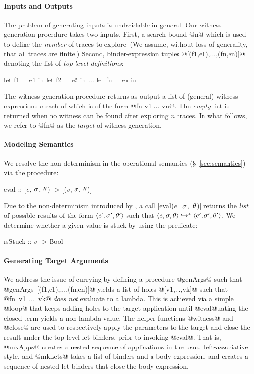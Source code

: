 \paragraph{Inputs and Outputs}
%
The problem of generating inputs is undecidable in general.
%
Our witness generation procedure takes two inputs.
%
First, a search bound @n@ which is used to define the \emph{number} of
traces to explore. (We assume, without loss of generality, that all
traces are finite.)
%
Second, binder-expression tuples @[(f1,e1),...,(fn,en)]@
denoting the list of \emph{top-level definitions}:
%
\begin{code}
  let f1 = e1 in
  let f2 = e2 in
  ...
  let fn = en in
\end{code}
%
The witness generation procedure returns as output a list of (general)
witness expressions $e$ each of which is of the form @fn v1 ... vn@.
%
The \emph{empty} list is returned when no witness can be found after
exploring $n$ traces.
%
In what follows, we refer to @fn@ as the \emph{target} of witness generation.

\paragraph{Modeling Semantics}
%
We resolve the non-determinism in the operational semantics
(\S~\ref{sec:semantics}) via the procedure:
%
\begin{mcode}
  eval :: ($e$, $\sigma$, $\theta$) -> [($v$, $\sigma$, $\theta$)]
\end{mcode}
%
Due to the non-determinism introduced by \gensym, a call
\hbox{|eval($e$, $\sigma$, $\theta$)|} returns the \emph{list} of possible results
of the form $\langle e', \sigma', \theta' \rangle$ such that
$\langle e, \sigma, \theta \rangle \hookrightarrow^{*} \langle e', \sigma', \theta' \rangle$.
%
We determine whether a given value is stuck by using the predicate:
%
\begin{mcode}
  isStuck :: $v$ -> Bool
\end{mcode}

\paragraph{Generating Target Arguments}
%
We address the issue of currying by defining a procedure @genArgs@ such that \\
\hbox{@genArgs [(f1,e1),...,(fn,en)]@} yields a list of holes @[v1,...,vk]@
such that \hbox{@fn v1 ... vk@} \emph{does not} evaluate to a lambda.
%
This is achieved via a simple @loop@ that keeps adding holes to the
target application until @eval@uating the closed term yields a
non-lambda value.
%
The helper functions @witness@ and @close@ are used to respectively
apply the parameters to the target and close the result under the top-level
let-binders, prior to invoking \hbox{@eval@.}
%
That is, @mkApps@ creates a nested sequence of applications in
the usual left-associative style, and @mkLets@ takes a list of
binders and a body expression, and creates a sequence of nested
let-binders that close the body expression.

